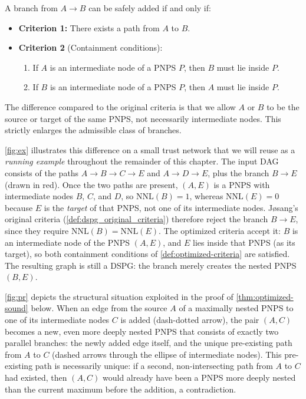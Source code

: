 \begin{definition}
\label{def:optimized-criteria}
A branch from $A \to B$ can be safely added if and only if:

\begin{itemize}
    \item \textbf{Criterion 1:} There exists a path from $A$ to $B$.
    \item \textbf{Criterion 2} (Containment conditions): 
    \begin{enumerate}
        \item If $A$ is an intermediate node of a  \ac{PNPS} $P$, then $B$ must lie inside $P$.
    \item If $B$ is an intermediate node of a  \ac{PNPS} $P$, then $A$ must lie inside $P$.
\end{enumerate}
\end{itemize}
\end{definition}

The difference compared to the original criteria is that we allow $A$ or $B$ to be the source or target of the same \ac{PNPS}, not necessarily intermediate nodes. This strictly enlarges the admissible class of branches.

\cref{fig:ex} illustrates this difference on a small trust network that we will reuse as a \emph{running example} throughout the remainder of this chapter. The input \ac{DAG} consists of the paths $A \to B \to C \to E$ and $A \to D \to E$, plus the branch $B \to E$ (drawn in red). Once the two paths are present, $(A,E)$ is a \ac{PNPS} with intermediate nodes $B$, $C$, and $D$, so $\mathrm{NNL}(B)=1$, whereas $\mathrm{NNL}(E)=0$ because $E$ is the \emph{target} of that \ac{PNPS}, not one of its intermediate nodes. J{\o}sang's original criteria (\cref{def:dspg_original_criteria}) therefore reject the branch $B \to E$, since they require $\mathrm{NNL}(B)=\mathrm{NNL}(E)$. The optimized criteria accept it: $B$ is an intermediate node of the \ac{PNPS} $(A,E)$, and $E$ lies inside that \ac{PNPS} (as its target), so both containment conditions of \cref{def:optimized-criteria} are satisfied. The resulting graph is still a \ac{DSPG}: the branch merely creates the nested \ac{PNPS} $(B,E)$.

\cref{fig:pr} depicts the structural situation exploited in the proof of \cref{thm:optimized-sound} below. When an edge from the source $A$ of a maximally nested \ac{PNPS} to one of its intermediate nodes $C$ is added (dash-dotted arrow), the pair $(A,C)$ becomes a new, even more deeply nested \ac{PNPS} that consists of exactly two parallel branches: the newly added edge itself, and the unique pre-existing path from $A$ to $C$ (dashed arrows through the ellipse of intermediate nodes). This pre-existing path is necessarily unique: if a second, non-intersecting path from $A$ to $C$ had existed, then $(A,C)$ would already have been a \ac{PNPS} more deeply nested than the current maximum before the addition, a contradiction.

